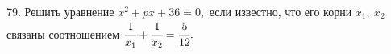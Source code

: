 79. Решить уравнение $x^2+px+36=0,$ если известно, что его корни $x_1,\ x_2$ связаны соотношением $\cfrac{1}{x_1}+\cfrac{1}{x_2}=\cfrac{5}{12}.$\\
